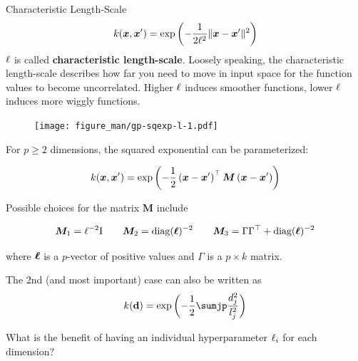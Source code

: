 \begin{frame}[c,allowframebreaks]{Characteristic Length-Scale}
    $$k(\bm{x}, \bm{x}^\prime) = \exp\left(-\frac{1}{2\ell^2}\|\bm{x} - \bm{x}^\prime\|^2\right)$$
$\ell$ is called \textbf{characteristic length-scale}. Loosely speaking, the characteristic length-scale describes how far you need to move in input space for the function values to become uncorrelated. Higher $\ell$ induces smoother functions, lower $\ell$ induces more wiggly functions.

\begin{figure}
\texttt{[image: figure\_man/gp-sqexp-l-1.pdf]}
\end{figure}


\framebreak

For $p \geq 2$ dimensions, the squared exponential can be parameterized:

$$
k(\bm{x}, \bm{x}^\prime) = \exp\,\biggl(- \frac{1}{2}\left(\bm{x} - \bm{x}^\prime\right)^\top\bm{M}\left(\bm{x} - \bm{x}^\prime \right)\biggr)
$$

Possible choices for the matrix $\bm{M}$ include

$$
\bm{M}_1 = \ell^{-2}\mathrm{I} \qquad \bm{M}_2 = \text{diag}(\bm{\ell})^{-2} \qquad \bm{M}_3 = \Gamma \Gamma^\top + \text{diag}(\bm{\ell})^{-2}
$$

where $\bm{\ell}$ is a $p$-vector of positive values and $\Gamma$ is a $p \times k$ matrix. 

\lz

The 2nd (and most important) case can also be written as 
$$
  k(\bold{d}) = \exp\,\biggl(- \frac{1}{2} \sumjp \frac{d_j^2}{l_j^2} \biggr)
$$



\framebreak


What is the benefit of having an individual hyperparameter $\ell_i$ for each dimension?


\end{frame}

